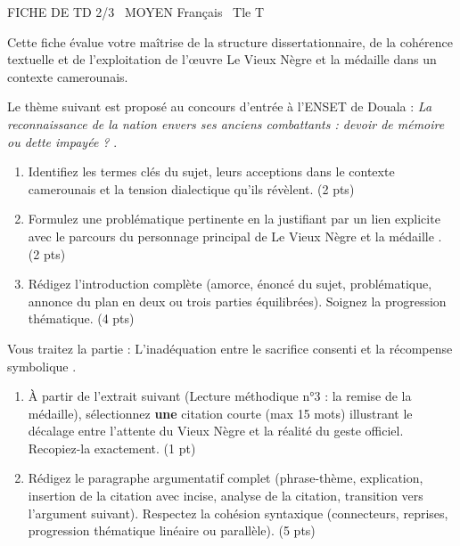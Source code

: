 \documentclass[11pt]{article}
\begin{document}
\begin{tcolorbox}[enhanced,colback=popink,colframe=popink,arc=10pt,boxrule=0pt,left=12pt,right=12pt,top=9pt,bottom=9pt]
{\color{white}\popxbold\small FICHE DE TD 2/3 \textbullet\ MOYEN \hfill Français \textbullet\ Tle T\par}
\end{tcolorbox}
\vspace{4pt}
\noindent Cette fiche évalue votre maîtrise de la structure dissertationnaire, de la cohérence textuelle et de l'exploitation de l'œuvre \og Le Vieux Nègre et la médaille \fg{} dans un contexte camerounais.

\begin{exercice}
Le thème suivant est proposé au concours d'entrée à l'ENSET de Douala : \og \textit{La reconnaissance de la nation envers ses anciens combattants : devoir de mémoire ou dette impayée ?} \fg{}.
\begin{enumerate}
    \item Identifiez les termes clés du sujet, leurs acceptions dans le contexte camerounais et la tension dialectique qu'ils révèlent. (2 pts)
    \item Formulez une problématique pertinente en la justifiant par un lien explicite avec le parcours du personnage principal de \og Le Vieux Nègre et la médaille \fg{}. (2 pts)
    \item Rédigez l'introduction complète (amorce, énoncé du sujet, problématique, annonce du plan en deux ou trois parties équilibrées). Soignez la progression thématique. (4 pts)
\end{enumerate}
\end{exercice}

\begin{exercice}
Vous traitez la partie : \og L'inadéquation entre le sacrifice consenti et la récompense symbolique \fg{}.
\begin{enumerate}
    \item À partir de l'extrait suivant (Lecture méthodique n°3 : la remise de la médaille), sélectionnez \textbf{une} citation courte (max 15 mots) illustrant le décalage entre l'attente du Vieux Nègre et la réalité du geste officiel. Recopiez-la exactement. (1 pt)
    \item Rédigez le paragraphe argumentatif complet (phrase-thème, explication, insertion de la citation avec incise, analyse de la citation, transition vers l'argument suivant). Respectez la cohésion syntaxique (connecteurs, reprises, progression thématique linéaire ou parallèle). (5 pts)
\end{enumerate}
\end{exercice}
\end{document}
